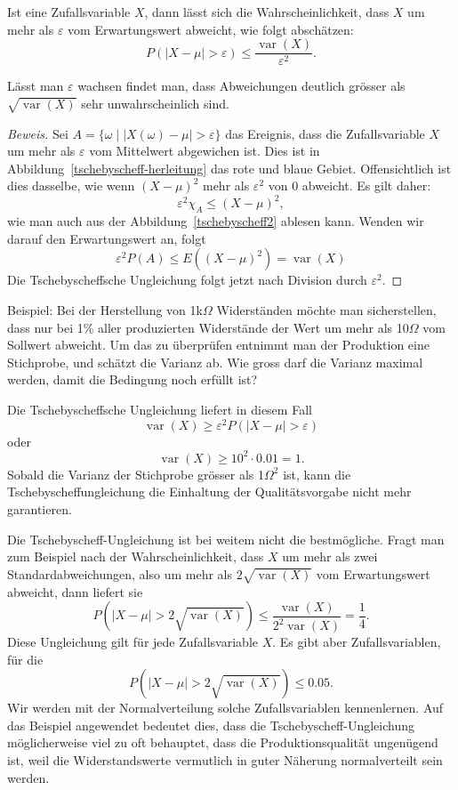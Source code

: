 \begin{satz}
Ist eine Zufallsvariable $X$, dann lässt sich die Wahrscheinlichkeit,
dass $X$ um mehr als $\varepsilon$ vom Erwartungswert abweicht, wie
folgt abschätzen:
\[
P(|X-\mu| >\varepsilon)\le\frac{\operatorname{var}(X)}{\varepsilon^2}.
\]
\end{satz}

Lässt man $\varepsilon$ wachsen findet man, dass Abweichungen
deutlich grösser als $\sqrt{\operatorname{var}(X)}$ 
sehr unwahrscheinlich sind.

\begin{proof}[Beweis]
Sei $A =\{\omega\;|\;|X(\omega)-\mu|>\varepsilon\}$ das Ereignis, dass die
Zufallsvariable $X$ um mehr als $\varepsilon$ vom Mittelwert abgewichen
ist.
Dies ist in Abbildung~\ref{tschebyscheff-herleitung} das rote und blaue Gebiet.
Offensichtlich ist dies dasselbe, wie wenn $(X-\mu)^2$ mehr als
$\varepsilon^2$ von 0 abweicht.
Es gilt daher:
\[
\varepsilon^2 \chi_{A} \le (X-\mu)^2,
\]
wie man auch aus der Abbildung~\ref{tschebyscheff2} ablesen kann.
Wenden wir darauf den Erwartungswert an, folgt
\[
\varepsilon^2 P(A)\le E((X-\mu)^2)=\operatorname{var}(X)
\]
Die Tschebyscheffsche Ungleichung folgt jetzt nach Division durch
$\varepsilon^2$.
\end{proof}
Beispiel:
Bei der Herstellung von 1k$\Omega$ Widerständen
möchte man sicherstellen,
dass nur bei 1\% aller produzierten Widerstände der Wert um mehr als
10$\Omega$ vom Sollwert abweicht.
Um das zu überprüfen entnimmt man der
Produktion eine Stichprobe, und schätzt die Varianz ab.
Wie gross darf die
Varianz maximal werden, damit die Bedingung noch erfüllt ist?

Die Tschebyscheffsche Ungleichung liefert in diesem Fall
\[
\operatorname{var}(X)\ge\varepsilon^2P(|X-\mu| >\varepsilon)
\]
oder
\[
\operatorname{var}(X)\ge 10^2\cdot 0.01=1.
\]
Sobald die Varianz der Stichprobe grösser als 1$\Omega^2$ ist, kann die
Tschebyscheffungleichung die Einhaltung der Qualitätsvorgabe nicht
mehr garantieren.

Die Tschebyscheff-Ungleichung ist bei weitem nicht die bestmögliche.
Fragt man zum Beispiel nach der Wahrscheinlichkeit, dass $X$ um mehr
als zwei Standardabweichungen, also um mehr als $2\sqrt{\operatorname{var}(X)}$ vom
Erwartungswert abweicht, dann liefert sie
\[
P(|X-\mu|>2\sqrt{\operatorname{var}(X)})
\le\frac{\operatorname{var}(X)}{2^2\operatorname{var}(X)}=\frac14.
\]
Diese Ungleichung gilt für jede Zufallsvariable $X$.
Es gibt aber Zufallsvariablen, für die 
\[
P(|X-\mu|>2\sqrt{\operatorname{var}(X)})\le 0.05.
\]
Wir werden mit der Normalverteilung solche Zufallsvariablen kennenlernen.
Auf das Beispiel angewendet bedeutet dies, dass die Tschebyscheff-Ungleichung
möglicherweise viel zu oft behauptet, dass die Produktionsqualität ungenügend
ist, weil die Widerstandswerte vermutlich in guter Näherung normalverteilt
sein werden.

